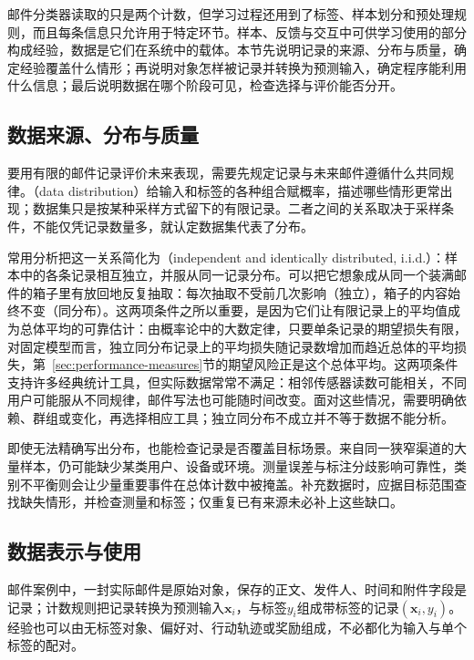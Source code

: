 邮件分类器读取的只是两个计数，但学习过程还用到了标签、样本划分和预处理规则，而且每条信息只允许用于特定环节。样本、反馈与交互中可供学习使用的部分构成经验，数据是它们在系统中的载体。本节先说明记录的来源、分布与质量，确定经验覆盖什么情形；再说明对象怎样被记录并转换为预测输入，确定程序能利用什么信息；最后说明数据在哪个阶段可见，检查选择与评价能否分开。

\subsection{数据来源、分布与质量}
\label{sec:experience-data-distribution}

要用有限的邮件记录评价未来表现，需要先规定记录与未来邮件遵循什么共同规律。（data distribution）给输入和标签的各种组合赋概率，描述哪些情形更常出现；数据集只是按某种采样方式留下的有限记录。二者之间的关系取决于采样条件，不能仅凭记录数量多，就认定数据集代表了分布。

常用分析把这一关系简化为（independent and identically distributed, i.i.d.）：样本中的各条记录相互独立，并服从同一记录分布。可以把它想象成从同一个装满邮件的箱子里有放回地反复抽取：每次抽取不受前几次影响（独立），箱子的内容始终不变（同分布）。这两项条件之所以重要，是因为它们让有限记录上的平均值成为总体平均的可靠估计：由概率论中的大数定律，只要单条记录的期望损失有限，对固定模型而言，独立同分布记录上的平均损失随记录数增加而趋近总体的平均损失，第~\ref{sec:performance-measures}节的期望风险正是这个总体平均。这两项条件支持许多经典统计工具，但实际数据常常不满足：相邻传感器读数可能相关，不同用户可能服从不同规律，邮件写法也可能随时间改变。面对这些情况，需要明确依赖、群组或变化，再选择相应工具；独立同分布不成立并不等于数据不能分析。

即使无法精确写出分布，也能检查记录是否覆盖目标场景。来自同一狭窄渠道的大量样本，仍可能缺少某类用户、设备或环境。测量误差与标注分歧影响可靠性，类别不平衡则会让少量重要事件在总体计数中被掩盖。补充数据时，应据目标范围查找缺失情形，并检查测量和标签；仅重复已有来源未必补上这些缺口。

\subsection{数据表示与使用}
\label{sec:experience-data-representation}

邮件案例中，一封实际邮件是原始对象，保存的正文、发件人、时间和附件字段是记录；计数规则把记录转换为预测输入$\bm{x}_i$，与标签$y_i$组成带标签的记录$(\bm{x}_i,y_i)$。经验也可以由无标签对象、偏好对、行动轨迹或奖励组成，不必都化为输入与单个标签的配对。

